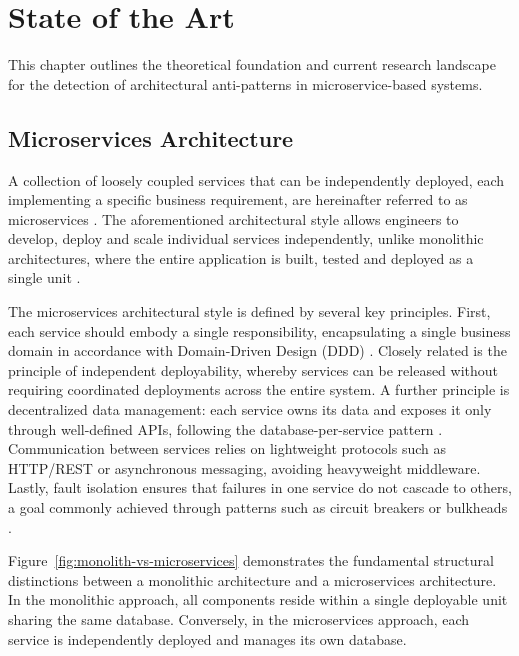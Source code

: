 \chapter{State of the Art}
\label{chap:ch2}

\par This chapter outlines the theoretical foundation and current research landscape for the detection of architectural anti-patterns in microservice-based systems.

\section {Microservices Architecture}
\label{section:microservices-background}

\par A collection of loosely coupled services that can be independently deployed, each implementing a specific business requirement, are hereinafter referred to as microservices \cite{Newman2015}. The aforementioned architectural style allows engineers to develop, deploy and scale individual services independently, unlike monolithic architectures, where the entire application is built, tested and deployed as a single unit \cite{Richardson2018}.

The microservices architectural style is defined by several key principles. First, each service should embody a single responsibility, encapsulating a single business domain in accordance with Domain-Driven Design (DDD) \cite{Evans2004}. Closely related is the principle of independent deployability, whereby services can be released without requiring coordinated deployments across the entire system. A further principle is decentralized data management: each service owns its data and exposes it only through well-defined APIs, following the database-per-service pattern \cite{Richardson2018}. Communication between services relies on lightweight protocols such as HTTP/REST or asynchronous messaging, avoiding heavyweight middleware. Lastly, fault isolation ensures that failures in one service do not cascade to others, a goal commonly achieved through patterns such as circuit breakers or bulkheads \cite{Nygard2018}.

Figure~\ref{fig:monolith-vs-microservices} demonstrates the fundamental structural distinctions between a monolithic architecture and a microservices architecture. In the monolithic approach, all components reside within a single deployable unit sharing the same database. Conversely, in the microservices approach, each service is independently deployed and manages its own database.

